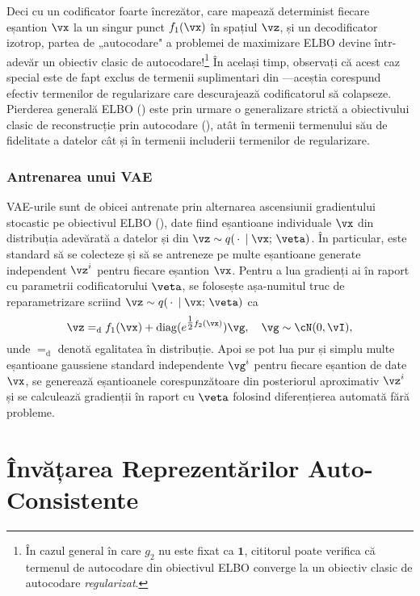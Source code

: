 \documentclass[../../book-main_ro.tex]{subfiles}
\begin{document}
Deci cu un codificator foarte încrezător, care mapează determinist fiecare eșantion
$\vx$ la un singur punct $f_1(\vx)$ în spațiul $\vz$, și un decodificator izotrop,
partea de „autocodare" a problemei de maximizare ELBO devine într-adevăr
un obiectiv clasic de autocodare!\footnote{În cazul general în care $g_2$ nu este
fixat ca $\mathbf{1}$, cititorul poate verifica că termenul de autocodare din
obiectivul ELBO converge la un obiectiv clasic de autocodare \textit{regularizat}.}
În același timp, observați că acest caz special este de fapt exclus de
termenii suplimentari din ---aceștia corespund efectiv
termenilor de regularizare care descurajează codificatorul să colapseze.
Pierderea generală ELBO () este
prin urmare o generalizare strictă a obiectivului clasic de reconstrucție prin autocodare
(), atât în termenii termenului său de fidelitate a datelor
cât și în termenii includerii termenilor de regularizare.

\subsubsection{Antrenarea unui VAE}
VAE-urile sunt de obicei antrenate prin alternarea ascensiunii gradientului stocastic pe obiectivul
ELBO (), date fiind eșantioane individuale
$\vx$ din
distribuția adevărată a datelor și din $\vz \sim q(\,\cdot\,\mid \vx;\, \veta)$. În
particular, este standard să se colecteze și să se antreneze pe multe eșantioane generate independent
$\vz^{i}$ pentru fiecare eșantion $\vx$. Pentru a lua gradienți ai
 în raport cu parametrii codificatorului $\veta$,
se folosește așa-numitul truc de reparametrizare scriind $\vz \sim
q(\,\cdot\,\mid \vx;\, \veta)$ ca
\begin{equation*}
\vz =_{\mathrm{d}} f_1(\vx) + \diag(e^{\tfrac{1}{2}f_2(\vx)}) \vg,
\quad \vg \sim
\cN(0, \vI),
\end{equation*}
unde $=_{\mathrm{d}}$ denotă egalitatea în distribuție. Apoi se pot lua pur și simplu
multe eșantioane gaussiene standard independente $\vg^{i}$ pentru fiecare eșantion de date
$\vx$, se generează eșantioanele corespunzătoare din posteriorul aproximativ
$\vz^i$ și se calculează gradienții în raport cu $\veta$ folosind diferențierea
automată fără probleme.



\section{Învățarea Reprezentărilor Auto-Consistente}
\label{sec:self-consistency}
\end{document}
